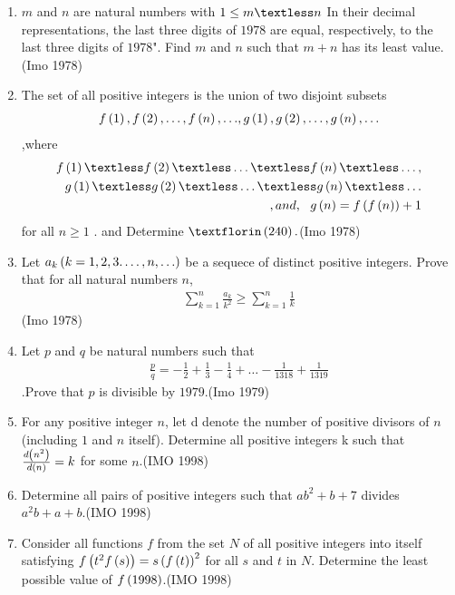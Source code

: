 \begin{enumerate}
	\item $m$ and $n$ are natural numbers with $1 \leq m \textless n$ In their decimal representations, the last three digits of $1978$ are equal, respectively, to the last three digits of $1978$". Find $m$ and $n$ such that $m+n$ has its least value.\hfill(Imo 1978)

\item The set of all positive integers is the union of two disjoint subsets 
\begin{align}
{f\ensuremath{\left(1\right)}, f\ensuremath{\left(2\right)} ,\ldots,f\ensuremath{\left(n\right)},\ldots} ,{ g\left(1\right),g\left(2\right),\ldots,g\left(n\right),\ldots} 
\end{align},where
\begin{align}
f\brak{1}\textless f\brak{2} \textless \ldots \textless f\brak{n} \textless \ldots,\\ g\brak{1} \textless g\brak{2} \textless \ldots \textless g\brak{n}\textless \ldots\\, and,\ \   g\brak{n}=f\brak{f\brak{n}} + 1
\end{align}
for all $n \geq 1$
		. and Determine $ƒ\brak{240}.$\hfill(Imo 1978)

\item Let ${a_{k}\left(k=1,2,3.\ldots,n,\ldots\right)}$ be a sequece of distinct positive integers. Prove that for all natural numbers $n$,\begin{align}\sum_{k=1}^{n} \frac{a_{k}}{k^2} \geq \sum_{k=1}^{n} \frac{1}{k}\end{align}\hfill(Imo 1978)

\item Let $p$ and $q$ be natural numbers such that \begin{align}\frac{p}{q}=-\frac{1}{2}+\frac{1}{3}-\frac{1}{4}+\ldots -\frac{1}{1318}+\frac{1}{1319}\end{align}.Prove that $p$ is divisible by $1979$.\hfill(Imo 1979)

\item For any positive integer $n$, let d{} denote the number of positive divisors of $n$ (including $1$ and $n$ itself). Determine all positive integers k such that $ \frac{d\left(n^2\right)} {d\left(n\right)}  = k$ for some $n$.\hfill(IMO 1998) 

\item Determine all pairs  of positive integers such that $ab^2 + b + 7$ divides $a^2    b + a + b$.\hfill(IMO 1998)

\item  Consider all functions $f$ from the set $N$ of all positive integers into itself satisfying $f\left(t^2f\left(s\right)\right) = s\left(f\left(t\right)\right)^2$ for all $s$ and $t$ in $N$. Determine the least possible value of ${f\left(1998\right)}$.\hfill(IMO 1998)


\end{enumerate}
